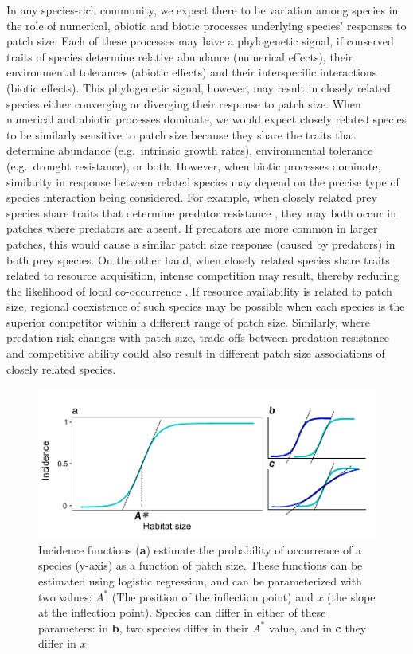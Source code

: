 In any species-rich community, we expect there to be variation among
species in the role of numerical, abiotic and biotic processes
underlying species' responses to patch size. Each of these processes may
have a phylogenetic signal, if conserved traits of species determine
relative abundance (numerical effects), their environmental tolerances
(abiotic effects) and their interspecific interactions (biotic effects).
This phylogenetic signal, however, may result in closely related species
either converging or diverging their response to patch size. When
numerical and abiotic processes dominate, we would expect closely
related species to be similarly sensitive to patch size because they
share the traits that determine abundance (e.g.~intrinsic growth rates),
environmental tolerance (e.g.~drought resistance), or both. However,
when biotic processes dominate, similarity in response between related
species may depend on the precise type of species interaction being
considered. For example, when closely related prey species share traits
that determine predator resistance \citep{Nyman2007}, they may both
occur in patches where predators are absent. If predators are more
common in larger patches, this would cause a similar patch size response
(caused by predators) in both prey species. On the other hand, when
closely related species share traits related to resource acquisition,
intense competition may result, thereby reducing the likelihood of local
co-occurrence \citep{Webb2002}. If resource availability is related to
patch size, regional coexistence of such species may be possible when
each species is the superior competitor within a different range of
patch size. Similarly, where predation risk changes with patch size,
trade-offs between predation resistance and competitive ability could
also result in different patch size associations of closely related
species.

\begin{figure}[htbp]
\centering
\includegraphics[width=5.5in]{figures/illustration.pdf}
\caption[Conceptual diagram of incidence functions]{Incidence functions (\textbf{a}) estimate the probability of
occurrence of a species (y-axis) as a function of patch size. These
functions can be estimated using logistic regression, and can be
parameterized with two values: \(A^{*}\) (The position of the inflection
point) and \(x\) (the slope at the inflection point). Species can differ
in either of these parameters: in \textbf{b}, two species differ in
their \(A^{*}\) value, and in \textbf{c} they differ in \(x\).}
\end{figure}

